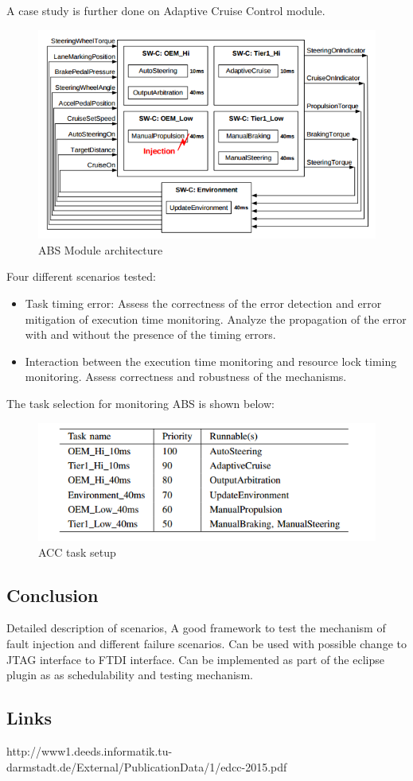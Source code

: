 A case study is further done on Adaptive Cruise Control module. 
\begin{figure}[H]
	\centering
	\includegraphics[width=400pt]{Pictures/ABS}
	\caption{ABS Module architecture}\label{abs}
\end{figure}


Four different scenarios tested:
\begin{itemize}
	\item Task timing error: Assess the correctness of the error detection and error mitigation of execution time monitoring. Analyze the propagation of the error with and without the presence of the timing errors.
	\item Interaction between the execution time monitoring and resource lock timing monitoring. Assess correctness and robustness of the mechanisms.
\end{itemize}

The task selection for monitoring ABS is shown below:
\begin{figure}[H]
	\centering
	\includegraphics[width=400pt]{Pictures/Task}
	\caption{ACC task setup}\label{abs}
\end{figure}
\subsection*{Conclusion} %
Detailed description of scenarios, A good framework to test the mechanism of fault injection and different failure scenarios.
Can be used with possible change to JTAG interface to FTDI interface. Can be implemented as part of the eclipse plugin as as schedulability and testing mechanism.

\subsection*{Links}
http://www1.deeds.informatik.tu-darmstadt.de/External/PublicationData/1/edcc-2015.pdf

